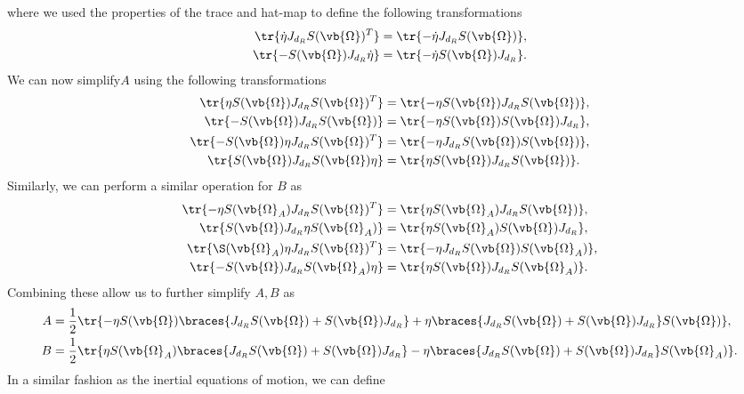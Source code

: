 \documentclass[11pt, reqno]{article}    %
\begin{document}
where we used the properties of the trace and hat-map to define the following transformations
\begin{align*}
    \tr{\dot{\eta} J_{d_{R}} S(\vb{\Omega})^T} &= \tr{- \dot{\eta} J_{d_{R}} S(\vb{\Omega})} , \\
    \tr{ - S(\vb{\Omega}) J_{d_{R}} \dot{\eta} } &= \tr{-\dot{\eta} S(\vb{\Omega}) J_{d_{R}}} .
\end{align*}
We can now simplify\( A \) using the following transformations
\begin{align*}
    \tr{ \eta S(\vb{\Omega}) J_{d_{R}} S(\vb{\Omega})^T} &= \tr{-\eta S(\vb{\Omega}) J_{d_{R}} S(\vb{\Omega})} , \\
    \tr{ - S(\vb{\Omega}) J_{d_{R}} S(\vb{\Omega})} &= \tr{-\eta S(\vb{\Omega}) S(\vb{\Omega}) J_{d_{R}}} , \\
    \tr{ -S(\vb{\Omega}) \eta J_{d_{R}} S(\vb{\Omega})^T} &= \tr{-\eta J_{d_{R}} S(\vb{\Omega}) S(\vb{\Omega})} , \\
    \tr{ S(\vb{\Omega}) J_{d_{R}} S(\vb{\Omega}) \eta} &= \tr{\eta S(\vb{\Omega}) J_{d_{R}} S(\vb{\Omega})}.
\end{align*}
Similarly, we can perform a similar operation for \( B \) as
\begin{align*}
    \tr{-\eta S(\vb{\Omega}_A) J_{d_{R}} S(\vb{\Omega})^T} &= \tr{\eta S(\vb{\Omega}_A) J_{d_{R}} S(\vb{\Omega})} , \\
    \tr{ S(\vb{\Omega}) J_{d_{R}} \eta S(\vb{\Omega}_A)} &= \tr{\eta S(\vb{\Omega}_A) S(\vb{\Omega}) J_{d_{R}}} , \\
    \tr{\S(\vb{\Omega}_A) \eta J_{d_{R}} S(\vb{\Omega})^T} &= \tr{-\eta J_{d_{R}} S(\vb{\Omega}) S(\vb{\Omega}_A)} , \\
    \tr{-S(\vb{\Omega}) J_{d_{R}} S(\vb{\Omega}_A) \eta} &= \tr{\eta S(\vb{\Omega}) J_{d_{R}} S(\vb{\Omega}_A)} .
\end{align*}
Combining these allow us to further simplify \( A,B \) as
\begin{align*}
    A &= \frac{1}{2} \tr{ -\eta S(\vb{\Omega}) \braces{J_{d_{R}} S(\vb{\Omega}) + S(\vb{\Omega}) J_{d_{R}}} + \eta \braces{J_{d_{R}} S(\vb{\Omega}) + S(\vb{\Omega}) J_{d_{R}}} S(\vb{\Omega})} , \\
    B &= \frac{1}{2} \tr{ \eta S(\vb{\Omega}_A) \braces{J_{d_{R}} S(\vb{\Omega}) + S(\vb{\Omega}) J_{d_{R}}} - \eta \braces{J_{d_{R}} S(\vb{\Omega}) + S(\vb{\Omega}) J_{d_{R}}} S(\vb{\Omega}_A) } .
\end{align*}
In a similar fashion as the inertial equations of motion, we can define
\end{document}
